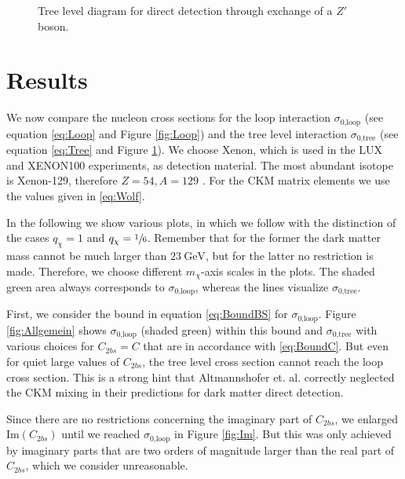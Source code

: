 \begin{figure}
	\centering
	\resizebox{.3\textwidth}{!}{
		
	}
	\caption{Tree level diagram for direct detection through exchange of a $Z'$ boson.}
	\label{fig:Tree}
\end{figure}

\section{Results}
We now compare the nucleon cross sections for the loop interaction $\sigma_\text{0,loop}$ (see equation \eqref{eq:Loop} and Figure \ref{fig:Loop}) and the tree level interaction $\sigma_\text{0,tree}$ (see equation \eqref{eq:Tree} and Figure \ref{fig:Tree}). We choose Xenon, which is used in the LUX and XENON100 experiments, as detection material. The most abundant isotope is Xenon-129, therefore $Z = 54, A=129$ \cite{DD}. For the CKM matrix elements we use the values given in \eqref{eq:Wolf}.


In the following we show various plots, in which we follow \cite{Z} with the distinction of the cases $q_\chi= 1$ and $q_\chi=\sfrac{1}{6}$. Remember that for the former the dark matter mass cannot be much larger than $\SI{23}{\giga\electronvolt}$, but for the latter no restriction is made. Therefore, we choose different $m_\chi$-axis scales in the plots. The shaded green area always corresponds to $\sigma_\text{0,loop}$, whereas the lines visualize $\sigma_\text{0,tree}$.


First, we consider the bound in equation \eqref{eq:BoundBS} for $\sigma_\text{0,loop}$. Figure \ref{fig:Allgemein} shows $\sigma_\text{0,loop}$ (shaded green) within this bound and $\sigma_\text{0,tree}$ with various choices for $C_{2bs} = C$ that are in accordance with \eqref{eq:BoundC}. But even for quiet large values of $C_{2bs}$, the tree level cross section cannot reach the loop cross section. This is a strong hint that Altmannshofer et. al. correctly neglected the CKM mixing in their predictions for dark matter direct detection.


Since there are no restrictions concerning the imaginary part of $C_{2bs}$, we enlarged $\text{Im}(C_{2bs})$ until we reached $\sigma_\text{0,loop}$ in Figure \ref{fig:Im}. But this was only achieved by imaginary parts that are two orders of magnitude larger than the real part of $C_{2bs}$, which we consider unreasonable.


